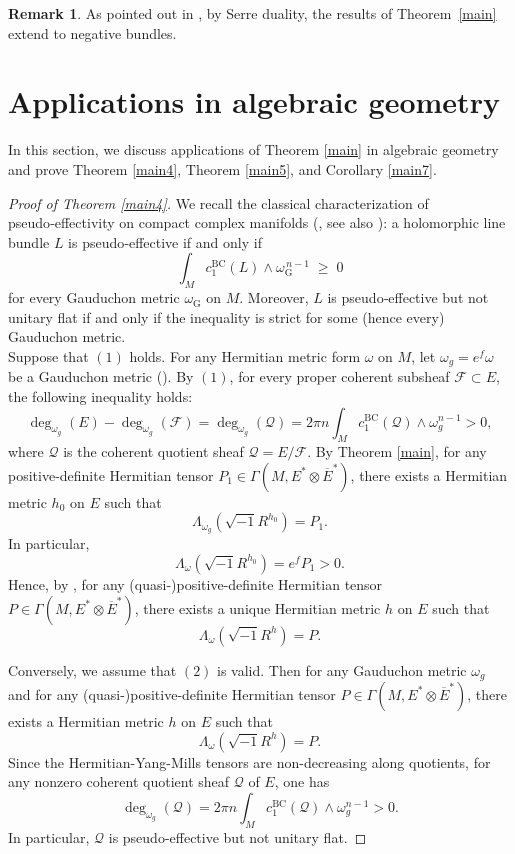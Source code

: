 \documentclass[12pt, reqno]{amsart}
\newcommand\cF{{\mathcal F}}
\newcommand\cQ{{\mathcal Q}}
\theoremstyle{plain}
\theoremstyle{definition}
\newtheorem{remark}[thm]{Remark}
\newcommand{\bproof}{\begin{proof}}
\newcommand{\eproof}{\end{proof}}
\newcommand{\bremark}{\begin{remark}}
\newcommand{\eremark}{\end{remark}}
\newcommand{\sq}{\sqrt{-1}}
\renewcommand{\bar}{\overline}
\newcommand{\beq}{\begin{equation}}
\newcommand{\eeq}{\end{equation}}
\newcommand{\ts}{\otimes}
\renewcommand{\>}{\rightarrow}
\renewcommand{\>}{\rightarrow}
\renewcommand{\bar}{\overline}
\numberwithin{equation}{section} %
\begin{document}
\bremark As pointed out in \cite{WYY26+}, by Serre duality, the results of Theorem~\ref{main} extend to negative bundles.
\eremark


\baselineskip


\section{Applications in algebraic geometry}
In this section, we discuss applications of Theorem \ref{main} in algebraic geometry and prove Theorem \ref{main4}, Theorem \ref{main5}, and Corollary \ref{main7}.\\

\bproof[Proof of Theorem \ref{main4}]
We recall the classical characterization of pseudo‑effectivity on compact complex manifolds (\cite{Buc99, Lam99}, see also \cite[Theorem~3.4]{Yang19}): 
a holomorphic line bundle $L$ is pseudo‑effective if and only if
\beq 
\int_M c_1^{\mathrm{BC}}(L) \wedge \omega_{\mathrm{G}}^{\,n-1} \;\ge\; 0
\eeq
for every Gauduchon metric $\omega_{\mathrm{G}}$ on $M$. 
Moreover,  $L$ is pseudo‑effective but not unitary flat  if and only if 
the inequality is strict for some (hence every) Gauduchon metric.\\

Suppose that $(1)$ holds. For any Hermitian metric form $\omega$ on $M$, let  $\omega_{g}=e^f\omega$ be a Gauduchon metric (\cite{Gau84}).   By $(1)$, for
every proper coherent subsheaf $\cF\subset E$, the following inequality holds:
\beq  \deg_{\omega_g}(E)-\deg_{\omega_g}(\cF)=\deg_{\omega_g}(\cQ)=
2\pi n\int_M c^{\mathrm{BC}}_1(\cQ)\wedge \omega_g^{n-1}>0,
\eeq
where $\cQ$ is the coherent quotient sheaf $\cQ=E/\cF$.
By Theorem \ref{main}, for any positive-definite Hermitian tensor $P_1\in \Gamma(M, E^*\ts \bar E^*)$,  there exists a Hermitian metric $h_0$ on $E$ such that 
$$\Lambda_{\omega_g}\left(\sq R^{h_0}\right)=P_1.$$
In particular, 
$$\Lambda_{\omega}\left(\sq R^{h_0}\right)=e^{f}P_1>0.$$
Hence, by \cite[Theorem~1.2]{XYY26+}, for any (quasi-)positive-definite Hermitian tensor $P \in  \Gamma(M, E^*\ts \bar E^*)$, there exists a unique Hermitian metric $h$ on $E$ such that 
\beq \Lambda_\omega\left(\sq R^{h}\right)=P. \eeq 

Conversely, we assume that $(2)$ is valid. Then  for any Gauduchon metric $\omega_g$ and for any (quasi-)positive-definite Hermitian tensor $P \in  \Gamma(M, E^*\ts \bar E^*)$, there exists a Hermitian metric $h$ on $E$ such that 
\beq \Lambda_\omega\left(\sq R^{h}\right)=P. \eeq 
Since the Hermitian-Yang-Mills tensors are non-decreasing along quotients, for any nonzero coherent quotient sheaf $\cQ$ of $E$,  one has
\beq 
\deg_{\omega_g}(\cQ)=2\pi n\int_M c^{\mathrm{BC}}_1(\cQ)\wedge \omega_g^{n-1}>0.\eeq 
In particular,  $\cQ$ is pseudo-effective but not unitary flat.
\eproof
\end{document}

